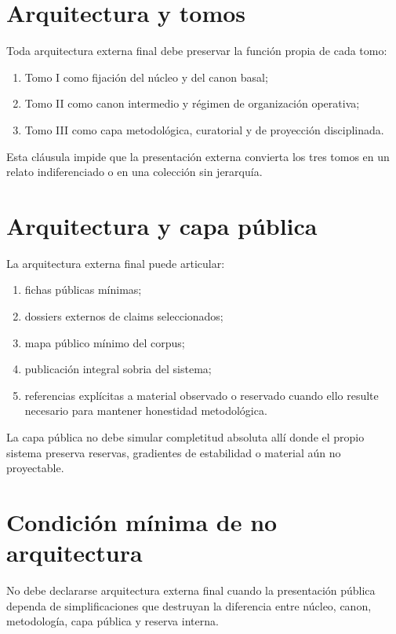 \section{Arquitectura y tomos}
\begin{definition}
Toda arquitectura externa final debe preservar la función propia de cada tomo:
\begin{enumerate}
  \item Tomo I como fijación del núcleo y del canon basal;
  \item Tomo II como canon intermedio y régimen de organización operativa;
  \item Tomo III como capa metodológica, curatorial y de proyección disciplinada.
\end{enumerate}
\end{definition}

\begin{observation}
Esta cláusula impide que la presentación externa convierta los tres tomos en un relato indiferenciado o en una colección sin jerarquía.
\end{observation}

\section{Arquitectura y capa pública}
\begin{definition}
La arquitectura externa final puede articular:
\begin{enumerate}
  \item fichas públicas mínimas;
  \item dossiers externos de claims seleccionados;
  \item mapa público mínimo del corpus;
  \item publicación integral sobria del sistema;
  \item referencias explícitas a material observado o reservado cuando ello resulte necesario para mantener honestidad metodológica.
\end{enumerate}
\end{definition}

\begin{observation}
La capa pública no debe simular completitud absoluta allí donde el propio sistema preserva reservas, gradientes de estabilidad o material aún no proyectable.
\end{observation}

\section{Condición mínima de no arquitectura}
\begin{definition}
No debe declararse arquitectura externa final cuando la presentación pública dependa de simplificaciones que destruyan la diferencia entre núcleo, canon, metodología, capa pública y reserva interna.
\end{definition}

